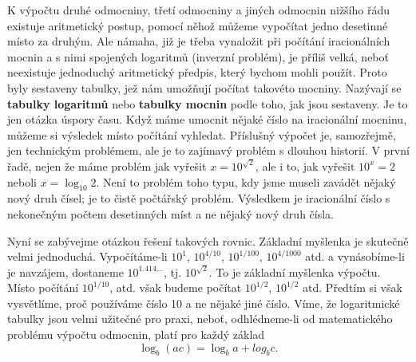     K výpočtu druhé odmocniny, třetí odmocniny a jiných odmocnin nižšího řádu existuje aritmetický
    postup, pomocí něhož můžeme vypočítat jedno desetinné místo za druhým. Ale námaha, již je třeba
    vynaložit při počítání iracionálních mocnin a s nimi spojených logaritmů (inverzní problém), je
    příliš velká, neboť neexistuje jednoduchý aritmetický předpis, který bychom mohli použít. Proto
    byly sestaveny tabulky, jež nám umožňují počítat takovéto mocniny. Nazývají se \textbf{tabulky
    logaritmů} nebo \textbf{tabulky mocnin} podle toho, jak jsou sestaveny. Je to jen otázka úspory
    času. Když máme umocnit nějaké číslo na iracionální mocninu, můžeme si výsledek místo počítání
    vyhledat. Příslušný výpočet je, samozřejmě, jen technickým problémem, ale je to zajímavý problém
    s dlouhou historií. V první řadě, nejen že máme problém jak vyřešit \(x=10^{\sqrt{2}}\), ale i
    to, jak vyřešit \(10^x=2\) neboli \(x= \log_{10}2\). Není to problém toho typu, kdy jsme
    museli zavádět nějaký nový druh čísel; je to čistě počtářský problém. Výsledkem je iracionální
    číslo s nekonečným počtem desetinných míst a ne nějaký nový druh čísla.

    Nyní se zabývejme otázkou řešení takových rovnic. Základní myšlenka je skutečně velmi
    jednoduchá. Vypočítáme-li \(10^1\), \(10^{4/10}\), \(10^{1/100}\), \(10^{4/1000}\) atd. a
    vynásobíme-li je navzájem, dostaneme \(10^{1.414\ldots}\), tj. \(10^{\sqrt{2}}\). To je
    základní myšlenka výpočtu. Místo počítání \(10^{1/10}\), atd. však budeme počítat \(10^{1/2}\),
    \(10^{1/2}\) atd. Předtím si však vysvětlíme, proč používáme číslo \num{10} a ne nějaké jiné
    číslo. Víme, že logaritmické tabulky jsou velmi užitečné pro praxi, neboť, odhlédneme-li od
    matematického problému výpočtu odmocnin, platí pro každý základ
    \begin{equation}\label{fyz:eq693}
      \log_b(ac)=\log_ba+log_bc.
    \end{equation}
  
